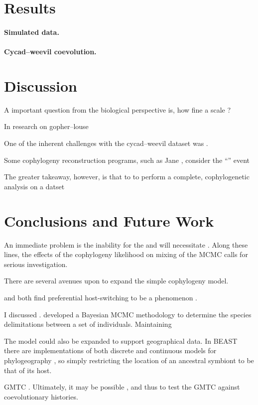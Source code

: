 \documentclass[12pt,letterpaper]{article}
\begin{document}
\section*{Results}

\paragraph*{Simulated data.}

\paragraph*{Cycad--weevil coevolution.}

\section*{Discussion}

A important question from the biological perspective is, how fine a scale ? 

In research on gopher--louse

One of the inherent challenges with the cycad--weevil dataset was . 

Some cophylogeny reconstruction programs, such as Jane \parencite{Conow:2010}, consider the \enquote{} event

The greater takeaway, however, is that to to perform a complete, cophylogenetic analysis on a datset

\section*{Conclusions and Future Work}

An immediate problem is the inability for the and will necessitate . Along these lines, the effects of the cophylogeny likelihood on mixing of the \ac{MCMC} calls for serious investigation. 

There are several avenues upon to expand the simple cophylogeny model. 

\textcite{Charleston:2002} and \textcite{Faria:2013} both find preferential host-switching to be a phenomenon . 

I discussed . \textcite{Yang:2010} developed a Bayesian \ac{MCMC} methodology to determine the species delimitations between a set of individuals. Maintaining 

The model could also be expanded to support geographical data. In BEAST there are implementations of both discrete and continuous models for phylogeography \parencites{Lemey:2009}{Lemey:2010}, so simply restricting the location of an ancestral symbiont to be that of its host.

\ac{GMTC} . Ultimately, it may be possible , and thus to test the \ac{GMTC} against coevolutionary histories.

\printbibliography
\end{document}
